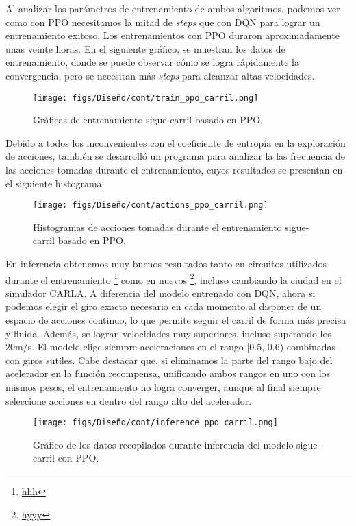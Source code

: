 Al analizar los parámetros de entrenamiento de ambos algoritmos, podemos ver como con \ac{PPO} necesitamos la mitad de \textit{steps} que con \ac{DQN} para lograr un entrenamiento exitoso. Los entrenamientos con \ac{PPO} duraron aproximadamente unas veinte horas. En el siguiente gráfico, se muestran los datos de entrenamiento, donde se puede observar cómo se logra rápidamente la convergencia, pero se necesitan más \textit{steps} para alcanzar altas velocidades.
\begin{figure}[ht]
  \centering
  \texttt{[image: figs/Diseño/cont/train\_ppo\_carril.png]}
  \caption{Gráficas de entrenamiento sigue-carril basado en \ac{PPO}.}
  \label{fig:train_ppo_carril}
\end{figure}

Debido a todos los inconvenientes con el coeficiente de entropía en  la exploración de acciones, también se desarrolló un programa para analizar la las frecuencia de las acciones tomadas durante el entrenamiento, cuyos resultados se presentan en el siguiente histograma.
\begin{figure}[ht]
  \centering
  \texttt{[image: figs/Diseño/cont/actions\_ppo\_carril.png]}
  \caption{Histogramas de acciones tomadas durante el entrenamiento sigue-carril basado en \ac{PPO}.}
  \label{fig:actions_ppo_carril}
\end{figure}

En inferencia obtenemos muy buenos resultados tanto en circuitos utilizados durante el entrenamiento \footnote{\url{hhh}} como en nuevos \footnote{\url{hyyy}}, incluso cambiando la ciudad en el simulador CARLA. A diferencia del modelo entrenado con \ac{DQN}, ahora si podemos elegir el giro exacto necesario en cada momento al disponer de un espacio de acciones continuo, lo que permite seguir el carril de forma más precisa y fluida. Además, se logran velocidades muy superiores, incluso superando los 20m/s. El modelo elige siempre aceleraciones en el rango [0.5, 0.6) combinadas con giros sutiles. Cabe destacar que, si eliminamos la parte del rango bajo del acelerador en la función recompensa, unificando ambos rangos en uno con los mismos pesos, el entrenamiento no logra converger, aunque al final siempre seleccione acciones en dentro del rango alto del acelerador.
\begin{figure}[ht]
  \centering
  \texttt{[image: figs/Diseño/cont/inference\_ppo\_carril.png]}
  \caption{Gráfico de los datos recopilados durante inferencia del modelo sigue-carril con \ac{PPO}.}
  \label{fig:inference_ppo_carril}
\end{figure}

